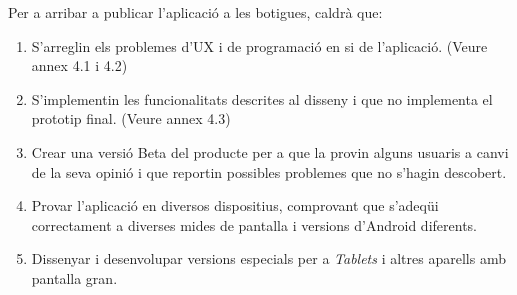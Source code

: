 Per a arribar a publicar l'aplicació a les botigues, caldrà que:

\begin{enumerate}
\item S'arreglin els problemes d'\ac{UX} i de programació en si de l'aplicació. (Veure annex 4.1 i 4.2)
\item S'implementin les funcionalitats descrites al disseny i que no implementa el prototip final. (Veure annex 4.3)
\item Crear una versió Beta del producte per a que la provin alguns usuaris a canvi de la seva opinió i que reportin possibles problemes que no s'hagin descobert.
\item Provar l'aplicació en diversos dispositius, comprovant que s'adeqüi correctament a diverses mides de pantalla i versions d'\gls{Android} diferents.
\item Dissenyar i desenvolupar versions especials per a \textit{Tablets} i altres aparells amb pantalla gran. 
\end{enumerate}